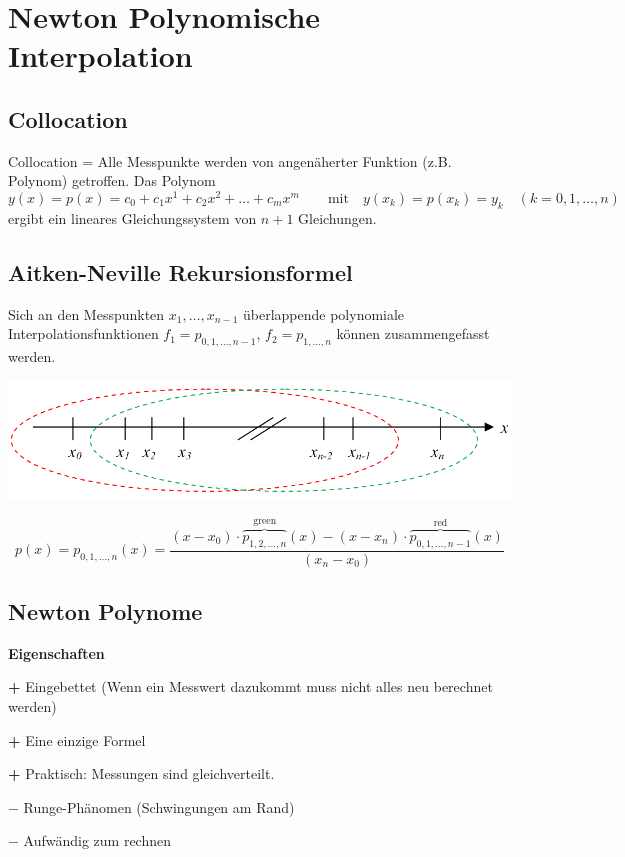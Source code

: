 
\section{Newton Polynomische Interpolation}
\subsection{Collocation}
Collocation = Alle Messpunkte werden von angenäherter Funktion (z.B. Polynom) getroffen.
Das Polynom 
\[y(x) = p(x) = c_0 + c_1x^1 + c_2x^2 + \ldots + c_mx^m \qquad \text{mit} \quad y(x_k)=p(x_k)=y_k \quad (k=0,1,\ldots,n) \]
ergibt ein lineares Gleichungssystem von $n+1$ Gleichungen.


\subsection{Aitken-Neville Rekursionsformel}
Sich an den Messpunkten $x_1,\ldots, x_{n-1}$ überlappende polynomiale Interpolationsfunktionen 
$f_1=p_{0,1,\ldots,n-1}$, $f_2=p_{1,\ldots,n}$ können zusammengefasst werden. 

\begin{minipage}{8cm}
\includegraphics[width=\textwidth]{bilder/aitkenNevilleIdee}
\end{minipage}
\hfill
\begin{minipage}{11cm}
    \[
        p(x) = p_{0,1,\ldots,n}(x) = \frac{(x-x_0) \cdot \overbrace{p_{1,2,\ldots,n}}^{\text{green}}(x) - (x-x_n) \cdot \overbrace{p_{0,1,\ldots,n-1}}^{\text{red}}(x)}{(x_n - x_0)}
    \]
\end{minipage}

\subsection{Newton Polynome} \label{ssec:newton_polynom}
\textbf{Eigenschaften}
\begin{liste}
	\item[\textbf{+}] Eingebettet (Wenn ein Messwert dazukommt muss nicht alles neu berechnet werden)
	\item[\textbf{+}] Eine einzige Formel
	\item[\textbf{+}] Praktisch: Messungen sind gleichverteilt.
	\item[$\mathbf{-}$] Runge-Phänomen (Schwingungen am Rand)
	\item[$\mathbf{-}$] Aufwändig zum rechnen
\end{liste}

